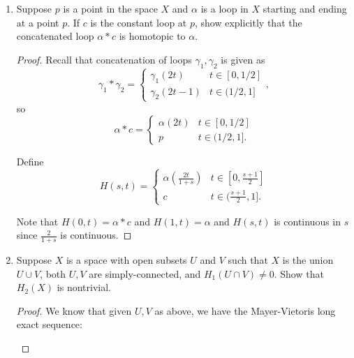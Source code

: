 \documentclass{article}
\begin{document}
\begin{enumerate}
	\item Suppose $p$ is a point in the space $X$ and $\alpha$ is a loop in $X$ starting and ending at a point $p$. If $c$ is the constant loop at $p$, show explicitly that the concatenated loop $\alpha * c$ is homotopic to $\alpha$.
	
	\begin{proof}
		Recall that concatenation of loops $\gamma_1, \gamma_2$ is given as
		\[ \gamma_1 * \gamma_2 = \begin{cases} \gamma_1(2t) & t \in [0,1/2] \\ \gamma_2(2t-1) & t \in (1/2,1]\end{cases},\]
		so 
		\[ \alpha * c = \begin{cases} \alpha(2t) & t \in [0,1/2] \\ p & t \in (1/2,1].\end{cases}\]
		
		Define 
		\[H(s,t) = \begin{cases} 
					\alpha(\frac{2t}{1+s}) & t \in [0,\frac{s+1}{2}] \\
			     		c & t \in (\frac{s+1}{2},1].
			      \end{cases}\]
		
		Note that $H(0,t) = \alpha * c$ and $H(1,t) = \alpha$ and $H(s,t)$ is continuous in $s$ since $\frac{2}{1+s}$ is continuous. 
	\end{proof}
	
	
	\setcounter{enumi}{4}
	\item Suppose $X$ is a space with open subsets $U$ and $V$ such that $X$ is the union $U \cup V$, both $U,V$ are simply-connected, and $H_1(U \cap V) \neq 0$. Show that $H_2(X)$ is nontrivial.
	
	\begin{proof}
		We know that given $U,V$ as above, we have the Mayer-Vietoris long exact sequence:	
		
		\begin{center}
		\end{center}
		

\end{proof}
\end{enumerate}
\end{document}
